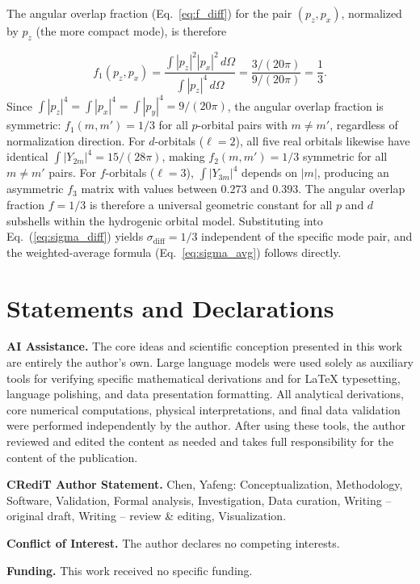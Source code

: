 \documentclass[11pt,a4paper]{article}
\begin{document}
The angular overlap fraction (Eq.~\ref{eq:f_diff}) for the pair $(p_z, p_x)$, normalized by $p_z$ (the more compact mode), is therefore

\begin{equation}
f_1(p_z, p_x) = \frac{\int |p_z|^2|p_x|^2 \, d\Omega}{\int |p_z|^4 \, d\Omega}
= \frac{3/(20\pi)}{9/(20\pi)} = \frac{1}{3}.
\end{equation}
Since $\int |p_z|^4 = \int |p_x|^4 = \int |p_y|^4 = 9/(20\pi)$, the angular overlap fraction is symmetric: $f_1(m,m') = 1/3$ for all $p$-orbital pairs with $m \neq m'$, regardless of normalization direction. For $d$-orbitals ($\ell = 2$), all five real orbitals likewise have identical $\int |Y_{2m}|^4 = 15/(28\pi)$, making $f_2(m,m') = 1/3$ symmetric for all $m \neq m'$ pairs. For $f$-orbitals ($\ell = 3$), $\int |Y_{3m}|^4$ depends on $|m|$, producing an asymmetric $f_3$ matrix with values between $0.273$ and $0.393$.
The angular overlap fraction $f = 1/3$ is therefore a universal geometric constant for all $p$ and $d$ subshells within the hydrogenic orbital model. Substituting into Eq.~(\ref{eq:sigma_diff}) yields $\sigma_{\mathrm{diff}} = 1/3$ independent of the specific mode pair, and the weighted-average formula (Eq.~\ref{eq:sigma_avg}) follows directly.


\section*{Statements and Declarations}
\textbf{AI Assistance.} The core ideas and scientific conception presented in this work are entirely the author's own. Large language models were used solely as auxiliary tools for verifying specific mathematical derivations and for LaTeX typesetting, language polishing, and data presentation formatting. All analytical derivations, core numerical computations, physical interpretations, and final data validation were performed independently by the author. After using these tools, the author reviewed and edited the content as needed and takes full responsibility for the content of the publication.

\textbf{CRediT Author Statement.} Chen, Yafeng: Conceptualization, Methodology, Software, Validation, Formal analysis, Investigation, Data curation, Writing -- original draft, Writing -- review \& editing, Visualization.

\textbf{Conflict of Interest.} The author declares no competing interests.

\textbf{Funding.} This work received no specific funding.
\end{document}
